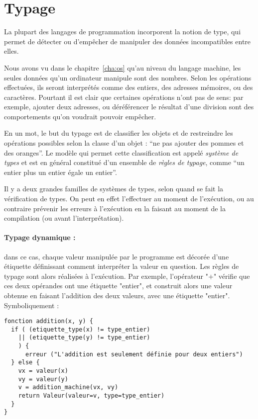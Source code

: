\section{Typage}

La plupart des langages de programmation incorporent la notion de type, qui
permet de détecter ou d'empêcher de manipuler des données incompatibles entre
elles.

Nous avons vu dans le chapitre~\ref{cha:os} qu'au niveau du langage machine, les
seules données qu'un ordinateur manipule sont des nombres. Selon les opérations
effectuées, ils seront interprétés comme des entiers, des adresses mémoires, ou
des caractères. Pourtant il est clair que certaines opérations n'ont pas de
sens: par exemple, ajouter deux adresses, ou déréférencer le résultat d'une
division sont des comportements qu'on voudrait pouvoir empêcher.

En un mot, le but du typage est de classifier les objets et de restreindre les
opérations possibles selon la classe d'un objet : ``ne pas ajouter des pommes et
des oranges''. Le modèle qui permet cette classification est appelé
\emph{système de types} et est en général constitué d'un ensemble de
\emph{règles de typage}, comme ``un entier plus un entier égale un entier''.

Il y a deux grandes familles de systèmes de types, selon quand se fait la
vérification de types. On peut en effet l'effectuer au moment de l'exécution, ou
au contraire prévenir les erreurs à l'exécution en la faisant au moment de la
compilation (ou avant l'interprétation).

\paragraph{Typage dynamique :} dans ce cas, chaque valeur manipulée par le
programme est décorée d'une étiquette définissant comment interpréter la valeur
en question. Les règles de typage sont alors réalisées à l'exécution. Par
exemple, l'opérateur "$+$" vérifie que ces deux opérandes ont une étiquette
"entier", et construit alors une valeur obtenue en faisant l'addition des deux
valeurs, avec une étiquette "entier". Symboliquement :

\begin{verbatim}
fonction addition(x, y) {
  if ( (etiquette_type(x) != type_entier)
    || (etiquette_type(y) != type_entier)
    ) {
      erreur ("L'addition est seulement définie pour deux entiers")
  } else {
    vx = valeur(x)
    vy = valeur(y)
    v = addition_machine(vx, vy)
    return Valeur(valeur=v, type=type_entier)
  }
}
\end{verbatim}

